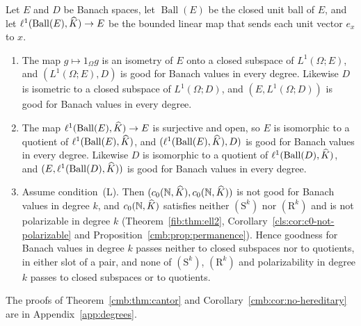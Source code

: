 \begin{corollary}\label{cmb:cor:no-hereditary}
Let $E$ and $D$ be Banach spaces, let $\operatorname{Ball}(E)$ be the closed unit ball of $E$, and let
$\ell^1(\operatorname{Ball}(E),\widehat K)\to E$ be the bounded linear map that sends each unit vector $e_x$ to $x$.
\begin{enumerate}
\item The map $g\mapsto1_\Omega g$ is an isometry of $E$ onto a closed subspace of $L^1(\Omega;E)$, and
$(L^1(\Omega;E),D)$ is good for Banach values in every degree. Likewise $D$ is isometric to a closed subspace of
$L^1(\Omega;D)$, and $(E,L^1(\Omega;D))$ is good for Banach values in every degree.
\item The map $\ell^1(\operatorname{Ball}(E),\widehat K)\to E$ is surjective and open, so $E$ is isomorphic to a quotient of $\ell^1(\operatorname{Ball}(E),\widehat K)$, and
$(\ell^1(\operatorname{Ball}(E),\widehat K),D)$ is good for Banach values in every degree. Likewise $D$ is isomorphic to a quotient of
$\ell^1(\operatorname{Ball}(D),\widehat K)$, and $(E,\ell^1(\operatorname{Ball}(D),\widehat K))$ is good for Banach values in every degree.
\item Assume condition~\textup{(L)}. Then $(c_0(\mathbb N,\widehat K),c_0(\mathbb N,\widehat K))$ is not good for Banach values in degree $k$, and
$c_0(\mathbb N,\widehat K)$ satisfies neither $(\mathrm S^k)$ nor $(\mathrm R^k)$ and is not polarizable in degree $k$
(Theorem~\ref{fib:thm:ell2}, Corollary~\ref{cls:cor:c0-not-polarizable} and Proposition~\ref{cmb:prop:permanence}). Hence
goodness for Banach values in degree $k$ passes neither to closed subspaces nor to quotients, in either slot of a pair, and
none of $(\mathrm S^k)$, $(\mathrm R^k)$ and polarizability in degree $k$ passes to closed subspaces or to quotients.
\end{enumerate}
\end{corollary}

The proofs of Theorem~\ref{cmb:thm:cantor} and Corollary~\ref{cmb:cor:no-hereditary} are in Appendix~\ref{app:degrees}.

